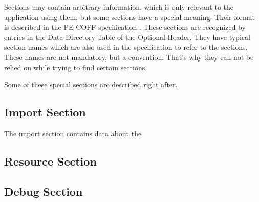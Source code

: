 Sections may contain arbitrary information, which is only relevant to the application using them; but some sections have a special meaning. Their format is described in the PE COFF specification \cite{pespec}. These sections are recognized by entries in the Data Directory Table of the Optional Header. They have typical section names which are also used in the specification to refer to the sections. These names are not mandatory, but a convention. That's why they can not be relied on while trying to find certain sections.

Some of these special sections are described right after.

\subsection*{Import Section}

The import section contains data about the

\subsection*{Resource Section}

\subsection*{Debug Section}
